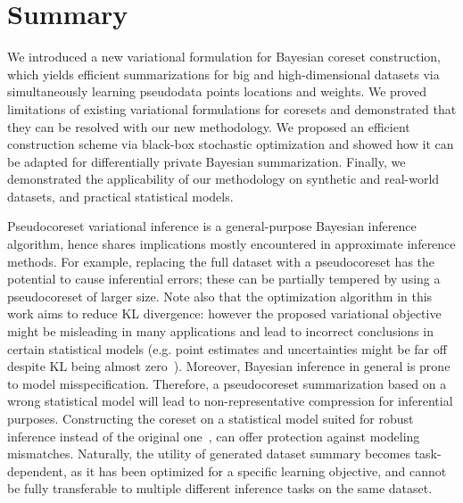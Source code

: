 \section{Summary}
We introduced a new variational formulation for Bayesian coreset construction, which yields efficient summarizations for big and high-dimensional datasets via simultaneously learning pseudodata points locations and weights. We proved limitations of existing variational formulations for coresets and demonstrated that they can be resolved with our new methodology. We proposed an efficient construction scheme via black-box stochastic optimization and showed how it can be adapted for differentially private Bayesian summarization. Finally, we demonstrated the applicability of our methodology on synthetic and real-world datasets, and practical statistical models.  


Pseudocoreset variational inference is a general-purpose Bayesian inference
algorithm, hence shares implications mostly encountered in approximate
inference methods. For example, replacing the full dataset with a
pseudocoreset has the potential to cause inferential errors; these can be
partially tempered by using a pseudocoreset of larger size. Note also
that the optimization algorithm in this work aims to reduce 
KL divergence: however the proposed
variational objective might be misleading in many applications and lead to
incorrect conclusions in certain statistical models (e.g. point estimates and
uncertainties might be far off despite KL being almost zero~\citep{huggins20}).
Moreover, Bayesian inference in general is prone to model misspecification.
Therefore, a pseudocoreset summarization based on a wrong statistical model
will lead to non-representative compression for inferential purposes.
Constructing the coreset on a statistical model suited for robust inference
instead of the original one~\citep{miller19, wang17}, can offer protection
against modeling mismatches. Naturally, the utility of generated dataset
summary becomes task-dependent, as it has been optimized for a specific
learning objective, and cannot be fully transferable to multiple different
inference tasks on the same dataset.

